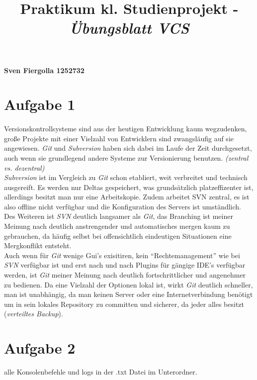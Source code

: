 \documentclass[12pt, a4paper]{article}
\title{Praktikum kl. Studienprojekt - \textit{Übungsblatt VCS}}
\begin{document}
\maketitle
\paragraph{Sven Fiergolla 1252732}
\section{Aufgabe 1}
\paragraph{}
Versionskontrollsysteme sind aus der heutigen Entwicklung kaum wegzudenken, große Projekte mit einer Vielzahl von Entwicklern sind zwangsläufig auf sie angewiesen. \textit{Git} und \textit{Subversion} haben sich dabei im Laufe der Zeit durchgesetzt, auch wenn sie grundlegend andere Systeme zur Versionierung benutzen. \textit{(zentral vs. dezentral)}\\
\textit{Subversion} ist im Vergleich zu \textit{Git} schon etabliert, weit verbreitet und technisch ausgereift. Es werden nur Deltas gespeichert, was grundsätzlich platzeffizenter ist, allerdings besitzt man nur eine Arbeitskopie. Zudem arbeitet SVN zentral, es ist also offline nicht verfügbar und die Konfiguration des Servers ist umständlich. Des Weiteren ist \textit{SVN} deutlich langsamer als \textit{Git}, das Branching ist meiner Meinung nach deutlich anstrengender und automatisches mergen kaum zu gebrauchen, da häufig selbst bei offensichtlich eindeutigen Situationen eine Mergkonflikt entsteht.\\
Auch wenn für \textit{Git} wenige Gui's exisitiren, kein \enquote{Rechtemanagement} wie bei \textit{SVN} verfügbar ist und erst nach und nach Plugins für gängige IDE's verfügbar werden, ist \textit{Git} meiner Meinung nach deutlich fortschrittlicher und angenehmer zu bedienen. Da eine Vielzahl der Optionen lokal ist, wirkt \textit{Git} deutlich schneller, man ist unabhängig, da man keinen Server oder eine Internetverbindung benötigt um in sein lokales Repository zu committen und sicherer, da jeder alles besitzt (\textit{verteiltes Backup}).
\par

\section{Aufgabe 2}
alle Konsolenbefehle und logs in der .txt Datei im Unterordner.
\end{document}

